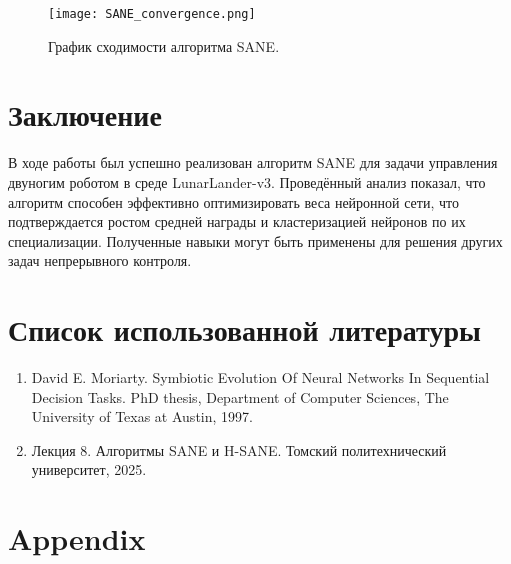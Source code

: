 \documentclass[a4paper,12pt]{article}
\begin{document}
\begin{figure}[H]
    \centering
    \texttt{[image: SANE\_convergence.png]}
    \caption{График сходимости алгоритма SANE.}
\end{figure}

\section{Заключение}
В ходе работы был успешно реализован алгоритм SANE для задачи управления двуногим роботом в среде LunarLander-v3. Проведённый анализ показал, что алгоритм способен эффективно оптимизировать веса нейронной сети, что подтверждается ростом средней награды и кластеризацией нейронов по их специализации. Полученные навыки могут быть применены для решения других задач непрерывного контроля.

\section*{Список использованной литературы}
\begin{enumerate}
    \item David E. Moriarty. Symbiotic Evolution Of Neural Networks In Sequential Decision Tasks. PhD thesis, Department of Computer Sciences, The University of Texas at Austin, 1997.
    \item Лекция 8. Алгоритмы SANE и H-SANE. Томский политехнический университет, 2025.
\end{enumerate}

\newpage
\section*{Appendix}
\end{document}

